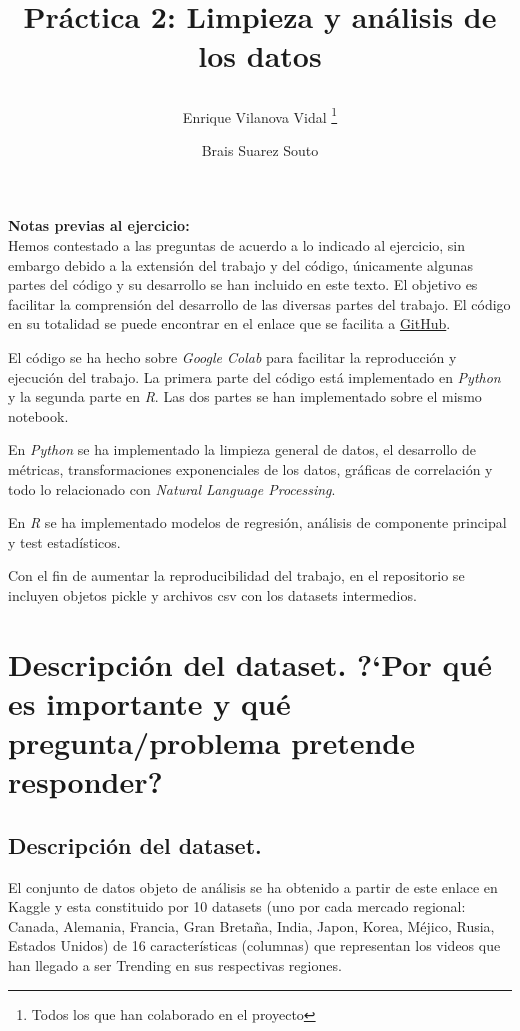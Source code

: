 \documentclass[a4paper,12pt]{article}
\title{%

Pr\'actica 2: Limpieza y an\'alisis de los datos
	
	\author{%
	Enrique Vilanova Vidal%
		\thanks{Todos los que han colaborado en el proyecto}
	\and Brais Suarez Souto
	}
}
\begin{document}
\maketitle
\thispagestyle{empty}
\clearpage
{} 
\newpage

\textbf{Notas previas al ejercicio:} \\

Hemos contestado a las preguntas de acuerdo a lo indicado al ejercicio, sin embargo debido a la extensi\'on del trabajo y del c\'odigo, \'unicamente algunas partes del c\'odigo y su desarrollo  se han incluido en este texto. El objetivo es facilitar la comprensi\'on del desarrollo de las diversas partes del trabajo. El c\'odigo en su totalidad se puede encontrar en el enlace que se facilita a  \href{https://github.com/b-suarez/youtube_stats_analysis}{GitHub}.

El c\'odigo se ha hecho sobre {\itshape Google Colab} para facilitar la reproducci\'on y ejecuci\'on del trabajo. La primera parte del c\'odigo est\'a implementado en {\itshape Python} y la segunda parte en {\itshape R}. Las dos partes se han implementado sobre el mismo notebook.

En {\itshape Python} se ha implementado la limpieza general de datos, el desarrollo de m\'etricas, transformaciones exponenciales de los datos, gr\'aficas de correlaci\'on y todo lo relacionado con {\itshape Natural Language Processing}.

En {\itshape R} se ha implementado modelos de regresi\'on, an\'alisis de componente principal y test estad\'isticos.

Con el fin de aumentar la reproducibilidad del  trabajo, en el repositorio se incluyen objetos pickle y archivos csv con los datasets intermedios.

\newpage
\section[item_descripcion]{Descripci\'on del dataset. ?`Por qu\'e es importante y qu\'e  pregunta/problema pretende responder?}

\subsection{Descripci\'on del dataset.}

El conjunto de datos objeto de an\'alisis se ha obtenido a partir de este enlace en Kaggle y esta constituido por 10 datasets (uno por cada mercado regional: Canada, Alemania, Francia, Gran Breta\~na, India, Japon, Korea, M\'ejico, Rusia, Estados Unidos) de 16 caracter\'isticas (columnas) que representan los videos que han llegado a ser Trending en sus respectivas regiones.
\end{document}
